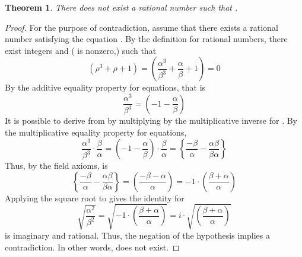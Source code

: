 \documentclass[preview]{standalone}
\newtheorem{theorem}{Theorem}
\begin{document}
\begin{theorem} %
    There does not exist a rational number \bm{$\rho$} such that 
    .
\end{theorem}

\begin{proof}
    For the purpose of contradiction, 
    assume that there exists a rational number \bm{$\rho$} satisfying the equation . 
    By the definition for rational numbers, 
    there exist integers \bm{$\alpha$} and \bm{$\beta$} (\bm{$\beta$} is nonzero,) such that 
    \begin{equation*}
        \left( 
            \rho ^3 + \rho + 1 
        \right) 
            = 
        \left( 
            \frac{\alpha^3}{\beta^3} + \frac{\alpha}{\beta} + 1 
        \right) 
            = 
        0
    \end{equation*}
    By the additive equality property for equations, that is
    \begin{equation*}
        \frac{\alpha^3}{\beta^3} 
            = 
        \left(
            -1 - \frac{\alpha}{\beta}
        \right)
    \end{equation*}
    It is possible to derive  from  
    by multiplying  by the multiplicative inverse for \bm{$\rho$}. 
    By the multiplicative equality property for equations,
    \begin{equation*}
        \frac{\alpha^3}{\beta^3} \cdot \frac{\beta}{\alpha}
            =
        \left(
            -1 - \frac{\alpha}{\beta}
        \right) 
            \cdot 
        \frac{\beta}{\alpha} 
            =
        \left\{
            \frac{-\beta}{\alpha} 
                - 
            \frac{\alpha \beta}{\beta \alpha}
        \right\}
    \end{equation*}
    Thus, by the field axioms,  is
    \begin{equation*}
        \left\{
            \frac{-\beta}{\alpha} 
                - 
            \frac{\alpha \beta}{\beta \alpha}
        \right\}
            = 
        \left(
            \frac{-\beta - \alpha}{\alpha}
        \right)
            = 
        -1 
            \cdot 
        \left( 
            \frac{\beta + \alpha}{\alpha}
        \right)
    \end{equation*}
    Applying the square root to  gives the identity for \bm{$\rho$}
    \begin{equation*}
        \sqrt{ \frac{\alpha^2}{\beta^2} } 
            =
        \sqrt{ -1 \cdot \left( \frac{\beta + \alpha}{\alpha} \right) } 
            =
        i \cdot \sqrt{ \left( \frac{\beta + \alpha}{\alpha} \right) }
    \end{equation*}
    \bm{$\rho$} is imaginary and rational. 
    Thus, the negation of the hypothesis implies a contradiction. 
    In other words, \bm{$\rho$} does not exist.
\color{lightgray} \end{proof}
\end{document}
